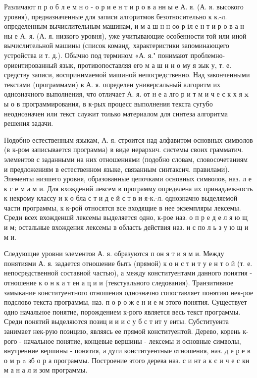 \documentclass[10pt]{article}
\begin{document}
Различают п р о б л е м н о - о р и е н т и р о в а нн ы е А. я. (А. я. высокого уровня), предназначенные для записи алгоритмов безотносительно к к.-л. определенным вычислительным машинам, и м а ш н н оо р іл е н т и р о в а н ны е А. я. (А. я. низкого уровня), уже учитывающие особенности той или иной вычислительной машины (список команд, характеристики запоминающего устройства и т. д.). Обычно под термином «А. я." понимают проблемно-ориентированный язык, противопоставляя его м а ш н н о му я зык у, т. е. средству записи, воспринимаемой машиной непосредственно. Над законченными текстами (программами) в А. я. определен универсальный алгоритм их однозначного выполнения, что отличает А. я. от н е а лго р и т м и ч е с к х я $\mathbf{x}$ ы о в программирования, в к-рых процесс выполнения текста сугубо неоднозначен или текст служит только материалом для синтеза алгоритма решения задачи.



Подобно естественным языкам, А. я. строится над алфавитом основных символов (в к-ром записывается программа) в виде иерархич. системы своих грамматич. элементов с заданными на них отношениями (подобно словам, словосочетаниям и предложениям в естественном языке, связанным синтаксич. правилами). Элементы низшего уровня, образованные цепочками основных символов, наз. л е к с е м а м и. Для вхождений лексем в программу определена их принадлежность к некрому классу и к о бла с т и д е й с т в и я-к.-л. однозначно выделяемой части программы, к к-рой относятся все входящие в нее экземпляры лексемы. Среди всех вхожденшй лексемы выделяется одно, к-рое наз. о п р е д е л я ю щ и м; остальные вхождения лексемы в область действия наз. и с по л ь з у ю щ и м и.



Следующие уровни элементов А. я. образуются п он я т и я м и. Между понятиями А. я. задается отношение быть (прямой) к о н с т и т у е н т о й (т. е. непосредственной составной частью), а между конституентами данного понятия - отношение к о н к а т ен а ц и и (текстуального следования). Транзитивное замыкание конституентного отношения однозначно сопоставляет понятию нек-рое подслово текста программы, наз. п о р о ж е н и е м этого понятия. Существует одно начальное понятие, порождением к-рого является весь текст программы. Среди понятий выделяются позиц и и и с у б с т ит у енты. Субституента занимает нек-рую позицию, являясь ее прямой конституентой. Дерево, корень к-рого - начальное понятие, концевые вершины - лексемы и основные символы, внутренние вершины - понятия, а дуги конституентные отношения, наз. д е р е в о м p a зб о р а программы. Построение этого дерева наз. с и нт а к с и ч е с ки м а н а л и зом программы.
\end{document}
